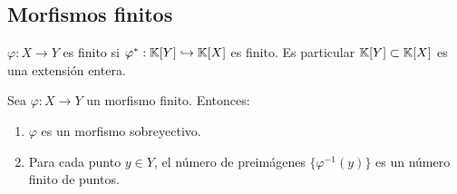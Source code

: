 \subsection{Morfismos finitos}

$\varphi: X \rightarrow Y$ es finito si $\varphi^*: \mathbb{K}[Y] \hookrightarrow \mathbb{K}[X]$ es finito. Es particular $\mathbb{K}[Y] \subset \mathbb{K}[X]$ es una extensión entera.

\begin{theorem}
	Sea $\varphi: X \rightarrow Y$ un morfismo finito. Entonces:
	\begin{enumerate}
		\item $\varphi$ es un morfismo sobreyectivo.
		\item Para cada punto $y \in Y$, el número de preimágenes $\{ \varphi^{-1}(y) \}$ es un número finito de puntos.
	\end{enumerate}
\end{theorem}

